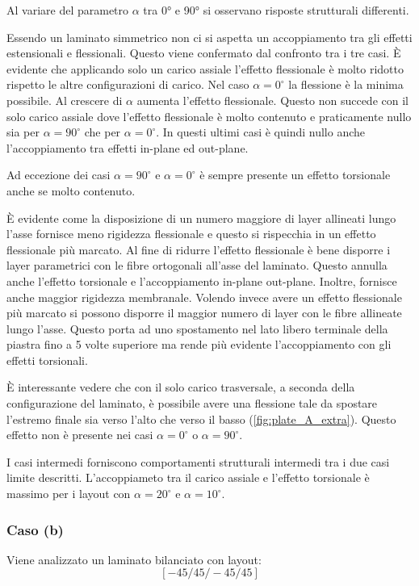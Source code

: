 \documentclass[a4paper,num-refs]{oup-contemporary}
\begin{document}
Al variare del parametro $\alpha$ tra 0° e 90° si osservano risposte strutturali differenti.

Essendo un laminato simmetrico non ci si aspetta un accoppiamento tra gli effetti estensionali e flessionali. Questo viene confermato dal confronto tra i tre casi. È evidente che applicando solo un carico assiale l'effetto flessionale è molto ridotto rispetto le altre configurazioni di carico. Nel caso $\alpha=0^\circ$ la flessione è la minima possibile. Al crescere di $\alpha$ aumenta l'effetto flessionale. Questo non succede con il solo carico assiale dove l'effetto flessionale è molto contenuto e praticamente nullo sia per $\alpha=90^\circ$ che per $\alpha=0^\circ$. In questi ultimi casi è quindi nullo anche l'accoppiamento tra effetti in-plane ed out-plane. 

Ad eccezione dei casi  $\alpha=90^\circ$ e $\alpha=0^\circ$ è sempre presente un effetto torsionale anche se molto contenuto. 

È evidente come la disposizione di un numero maggiore di layer allineati lungo l'asse fornisce meno rigidezza flessionale e questo si rispecchia in un effetto flessionale più marcato. Al fine di ridurre l'effetto flessionale è bene disporre i layer parametrici con  le fibre ortogonali all'asse del laminato. Questo annulla anche l'effetto torsionale e l'accoppiamento in-plane out-plane. Inoltre, fornisce anche maggior rigidezza membranale. Volendo invece avere un effetto flessionale più marcato si possono disporre il maggior numero di layer con le fibre allineate lungo l'asse. Questo porta ad uno spostamento nel lato libero terminale della piastra fino a 5 volte superiore ma rende più evidente l'accoppiamento con gli effetti torsionali. 

È interessante vedere che con il solo carico trasversale, a seconda della configurazione del laminato, è possibile avere una flessione tale da spostare l'estremo finale sia verso l'alto che verso il basso (\cref{fig:plate_A_extra}). Questo effetto non è presente nei casi $\alpha=0^\circ$ o $\alpha=90^\circ$.

I casi intermedi forniscono comportamenti strutturali intermedi tra i due casi limite descritti. L'accoppiameto tra il carico assiale e l'effetto torsionale è massimo per i layout con   $\alpha=20^\circ$ e $\alpha=10^\circ$. 



\subsubsection{Caso (b)}
\label{sec:plate_B}
Viene analizzato un laminato bilanciato con layout:
\begin{equation}
\left[-45 / 45 /-45 / 45\right]
\end{equation}
\end{document}
